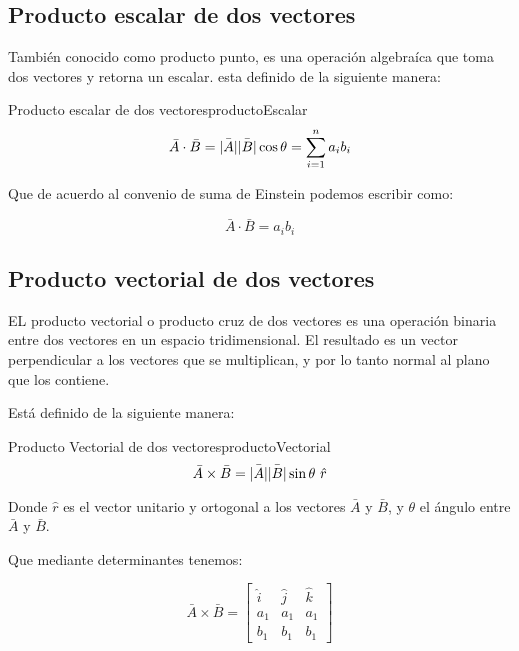\subsection*{Producto escalar de dos vectores}

También conocido como producto punto, es una operación algebraíca que toma dos
vectores y retorna un escalar. esta definido de la siguiente manera:

\begin{theorem}{Producto escalar de dos vectores}{productoEscalar}
    \begin{equation}
        \bar{A} \cdot \bar{B}= \bar{\lvert A\rvert} \bar{\lvert B\rvert} \cos \theta
        = \sum_{i=1}^{n} a_i b_i
    \end{equation}
\end{theorem}

Que de acuerdo al convenio de suma de Einstein podemos escribir como:

\begin{equation}
    \bar{A} \cdot \bar{B} = a_i b_i
\end{equation}

\subsection*{Producto vectorial de dos vectores}

EL producto vectorial o producto cruz de dos vectores es una operación binaria
entre dos vectores en un espacio tridimensional. El resultado es un vector
perpendicular a los vectores que se multiplican, y por lo tanto normal al plano
que los contiene.

Está definido de la siguiente manera:

\begin{theorem}{Producto Vectorial de dos vectores}{productoVectorial}
\begin{equation}
    \bar{A} \times \bar{B}= \bar{\lvert A\rvert} \bar{\lvert B\rvert} \sin \theta \  \hat{r}
\end{equation}
\end{theorem}

Donde $\hat{r}$ es el vector unitario y ortogonal a los vectores $\bar{A}$ y
$\bar{B}$, y $\theta$ el ángulo entre $\bar{A}$ y $\bar{B}$.

Que mediante determinantes tenemos:

\begin{equation}
    \bar{A} \times \bar{B}=
    \begin{bmatrix}
        \hat{i} & \hat{j} & \hat{k}\\ 
         a_1 & a_1 & a_1\\ 
         b_1 & b_1 & b_1
    \end{bmatrix}
\end{equation}


